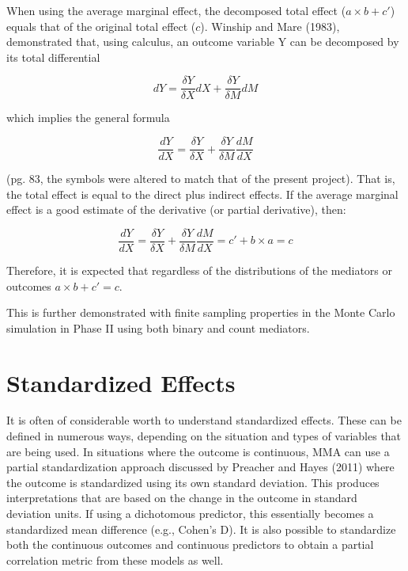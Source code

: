 \documentclass[]{DissertateUSU}
\begin{document}
When using the average marginal effect, the decomposed total effect
(\(a \times b + c'\)) equals that of the original total effect (\(c\)).
Winship and Mare (1983), demonstrated that, using calculus, an outcome
variable Y can be decomposed by its total differential

\begin{equation}
dY = \frac{\delta Y}{\delta X}dX + \frac{\delta Y}{\delta M}dM
\end{equation}

\noindent which implies the general formula

\begin{equation}
\frac{dY}{dX} = \frac{\delta Y}{\delta X} + \frac{\delta Y}{\delta M}\frac{dM}{dX}
\end{equation}

\noindent (pg. 83, the symbols were altered to match that of the present
project). That is, the total effect is equal to the direct plus indirect
effects. If the average marginal effect is a good estimate of the
derivative (or partial derivative), then:

\begin{equation}
\frac{dY}{dX} = \frac{\delta Y}{\delta X} + \frac{\delta Y}{\delta M}\frac{dM}{dX} = c' + b \times a = c
\end{equation}

\noindent Therefore, it is expected that regardless of the distributions
of the mediators or outcomes \(a \times b + c' = c\).

This is further demonstrated with finite sampling properties in the
Monte Carlo simulation in Phase II using both binary and count
mediators.

\section{Standardized Effects}\label{standardized-effects}

It is often of considerable worth to understand standardized effects.
These can be defined in numerous ways, depending on the situation and
types of variables that are being used. In situations where the outcome
is continuous, MMA can use a partial standardization approach discussed
by Preacher and Hayes (2011) where the outcome is standardized using its
own standard deviation. This produces interpretations that are based on
the change in the outcome in standard deviation units. If using a
dichotomous predictor, this essentially becomes a standardized mean
difference (e.g., Cohen's D). It is also possible to standardize both
the continuous outcomes and continuous predictors to obtain a partial
correlation metric from these models as well.
\end{document}

